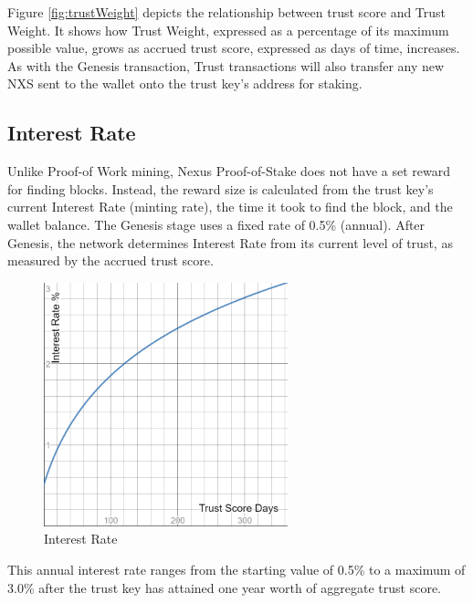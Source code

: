 \documentclass[11pt]{article}
\begin{document}
\noindent Figure \ref{fig:trustWeight} depicts the relationship between trust score and Trust Weight. It shows how Trust Weight, expressed as a percentage of its maximum possible value, grows as accrued trust score, expressed as days of time, increases.\\

\noindent As with the Genesis transaction, Trust transactions will also transfer any new NXS sent to the wallet onto the trust key's address for staking. \\

\subsection{Interest Rate}
Unlike Proof-of Work mining, Nexus Proof-of-Stake does not have a set reward for finding blocks. Instead, the reward size is calculated from the trust key's current Interest Rate (minting rate), the time it took to find the block, and the wallet balance. The Genesis stage uses a fixed rate of 0.5\% (annual). After Genesis, the network determines Interest Rate from its current level of trust, as measured by the accrued trust score.\\

\begin{figure}[h!]
    \centering
    \includegraphics[width=0.63\textwidth]{images/interestRate.png}
    \caption{Interest Rate \label{fig:interestRate}}
\end{figure}

\noindent This annual interest rate ranges from the starting value of 0.5\% to a maximum of 3.0\% after the trust key has attained one year worth of aggregate trust score. \\
\end{document}
